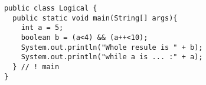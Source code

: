 \documentclass[en, 11pt, xcolor=dvipsnames]{beamer}
\begin{document}
\begin{frame}[fragile]


	\begin{columns}[c]
		\begin{column}{0.9\textwidth}

			\begin{lstlisting}[style=Java]
public class Logical {
  public static void main(String[] args){
    int a = 5;
    boolean b = (a<4) && (a++<10);
    System.out.println("Whole resule is " + b);
    System.out.println("while a is ... :" + a);
  } // ! main
}\end{lstlisting}

		\end{column}
	\end{columns}

\end{frame}
\end{document}
